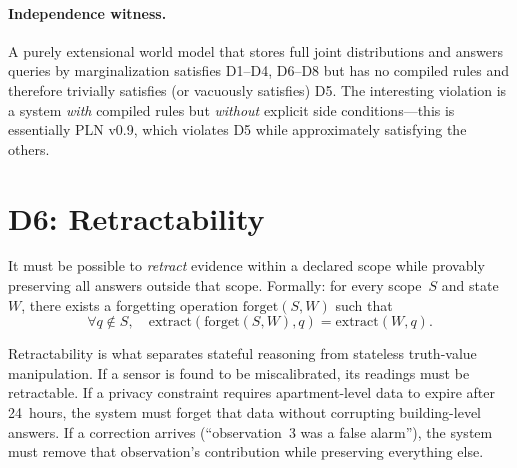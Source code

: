\documentclass[11pt,openany]{report}
\begin{document}
\paragraph{Independence witness.}
A purely extensional world model that stores full joint distributions
and answers queries by marginalization satisfies D1--D4, D6--D8 but
has no compiled rules and therefore trivially satisfies (or vacuously
satisfies) D5.  The interesting violation is a system \emph{with}
compiled rules but \emph{without} explicit side conditions---this is
essentially PLN v0.9, which violates D5 while approximately
satisfying the others.



\section{D6: Retractability}
\label{sec:d6}

\begin{definition}
\label{def:d6}
It must be possible to \emph{retract} evidence within a declared scope
while provably preserving all answers outside that scope.
Formally: for every scope~$S$ and state~$W$, there exists a
forgetting operation $\mathrm{forget}(S, W)$ such that
\[
  \forall q \notin S,\quad
  \mathrm{extract}(\mathrm{forget}(S, W), q) = \mathrm{extract}(W, q).
\]
\end{definition}

\noindent
Retractability is what separates stateful reasoning from stateless
truth-value manipulation.  If a sensor is found to be miscalibrated,
its readings must be retractable.  If a privacy constraint requires
apartment-level data to expire after 24~hours, the system must forget
that data without corrupting building-level answers.  If a correction
arrives (``observation~3 was a false alarm''), the system must remove
that observation's contribution while preserving everything else.
\end{document}
